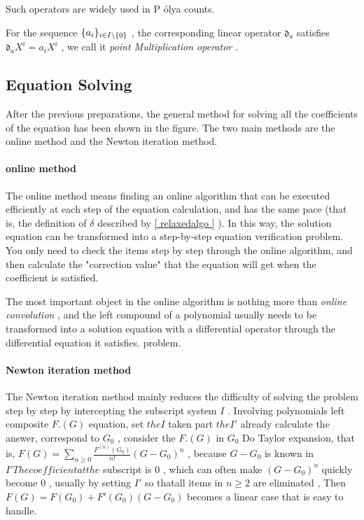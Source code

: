 Such operators are widely used in P \' olya counts.

\begin { definition }
For the sequence $ \{ a_i \} _{i \in  {I \backslash \{ 0 \} } } $ , the corresponding linear operator $ \mathfrak d_a $ satisfies $ \mathfrak d_a X^i = a_iX^i $ , we call it \emph { point Multiplication operator }.
\end { definition }

\subsection { Equation Solving }

After the previous preparations, the general method for solving all the coefficients of the equation has been shown in the figure. The two main methods are the online method and the Newton iteration method.

\paragraph { online method }

The online method means finding an online algorithm that can be executed efficiently at each step of the equation calculation, and has the same pace (that is, the definition of $ \delta $ described by \ref { relaxedalgo } ). In this way, the solution equation can be transformed into a step-by-step equation verification problem. You only need to check the items step by step through the online algorithm, and then calculate the "correction value" that the equation will get when the coefficient is satisfied.

The most important object in the online algorithm is nothing more than \emph { online convolution }, and the left compound of a polynomial usually needs to be transformed into a solution equation with a differential operator through the differential equation it satisfies. problem.

\paragraph { Newton iteration method }

The Newton iteration method mainly reduces the difficulty of solving the problem step by step by intercepting the subscript system $ I $ . Involving polynomials left composite $ F. (G) $ equation, set $ the I $ taken part $ the I ' $ already calculate the answer, correspond to $ G_ 0 $ , consider the $ F. (G) $ in $ G_ 0 $ Do Taylor expansion, that is, $ F(G) = \sum _{n \ge 0} \frac {F^{(n)}(G_0)}{n!} (G-G_ 0 )^n $ , because $ G-G_ 0 $ is known in $ I'The coefficient at the $ subscript is $ 0 $ , which can often make $ (G-G_ 0 )^n $ quickly become $ 0 $ , usually by setting $ I' $ so thatall items in $ n \ge  2 $ are eliminated , Then $ F(G) = F(G_ 0 ) + F'(G_ 0 )(G-G_ 0 ) $ becomes a linear case that is easy to handle.

